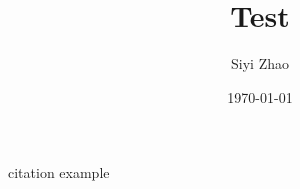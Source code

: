 \documentclass[10pt, a4paper]{ctexart}
\title{Test}
\author{Siyi Zhao}
\date{\today}
\begin{document}
\maketitle


citation example\cite{lyth2009}



\end{document}
